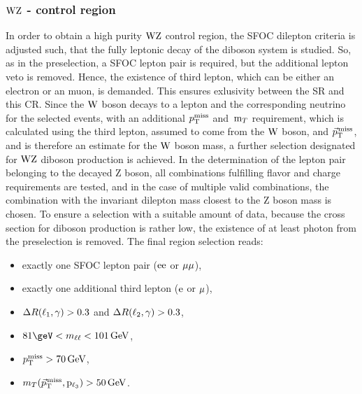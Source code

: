 \subsubsection*{$\mathrm{W}\mathrm{Z}$ - control region}
In order to obtain a high purity $\mathrm{W}\mathrm{Z}$ control region, the SFOC dilepton criteria is adjusted such, that the fully leptonic decay of the diboson system is studied. So, as in the preselection, a SFOC lepton pair is required, but the additional lepton veto is removed. Hence, the existence of third lepton, which can be either an electron or an muon, is demanded. This ensures exlusivity between the SR and this CR. Since the $\mathrm{W}$ boson decays to a lepton and the corresponding neutrino for the selected events, with an additional $p_{\mathrm{T}}^\text{miss}$ and $\,\text{m}_{T}$ requirement, which is calculated using the third lepton, assumed to come from the $\mathrm{W}$ boson, and ${\vec p}_{\mathrm{T}}^{\kern1pt\text{miss}}$, and is therefore an estimate for the $\mathrm{W}$ boson mass, a further selection designated for $\mathrm{W}\mathrm{Z}$ diboson production is achieved. In the determination of the lepton pair belonging to the decayed Z boson, all combinations fulfilling flavor and charge requirements are tested, and in the case of multiple valid combinations, the combination with the invariant dilepton mass closest to the Z boson mass is chosen. To ensure a selection with a suitable amount of data, because the cross section for diboson production is rather low, the existence of at least photon from the preselection is removed. The final region selection reads:
\begin{itemize}
 \item exactly one SFOC lepton pair ($\mathrm{e}\mathrm{e}$ or $\mu\mu$),
 \item exactly one additional third lepton ($\mathrm{e}$ or ${\mu}$),
 \item $\Delta R(\ell_1,\gamma)>0.3$ and $\Delta R(\ell_2,\gamma)>0.3$,
 \item $81\geV<m_{\ell\ell}<101\GeV$,
 \item $p_{\mathrm{T}}^\text{miss}>70\,\text{Ge\hspace{-.08em}V}$,
 \item $m_{T}({\vec p}_{\mathrm{T}}^{\kern1pt\text{miss}},\mathrm{p_{\ell_3}})>50\,\text{Ge\hspace{-.08em}V}$.
\end{itemize}
